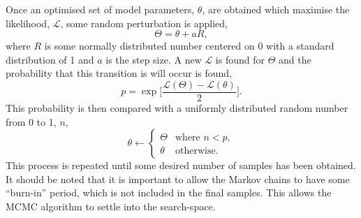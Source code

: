 \documentclass[
 reprint,
 superscriptaddress,
 amsmath,amssymb,
 aps,
]{revtex4-1}
\begin{document}
Once an optimised set of model parameters, $\theta$, are obtained which maximise the likelihood, $\mathcal{L}$, some random perturbation is applied, 
%
\begin{equation}
    \Theta = \theta + aR,
\end{equation}
%
where $R$ is some normally distributed number centered on \num{0} with a standard distribution of \num{1} and $a$ is the step size. 
A new $\mathcal{L}$ is found for $\Theta$ and the probability that this transition is will occur is found, 
%
\begin{equation}
    p = \exp{\bigg[\frac{\mathcal{L}(\Theta) - \mathcal{L}(\theta)}{2}\bigg]}. 
\end{equation}
%
This probability is then compared with a uniformly distributed random number from \num{0} to \num{1}, $n$,
%
\begin{equation}
    \theta \leftarrow
    \begin{cases}
        \Theta & \text{where } n < p,\\
        \theta & \text{otherwise}.
    \end{cases}
\end{equation}
%
This process is repeated until some desired number of samples has been obtained. 
It should be noted that it is important to allow the Markov chains to have some ``burn-in'' period, which is not included in the final samples. 
This allows the MCMC algorithm to settle into the search-space. 
\end{document}
